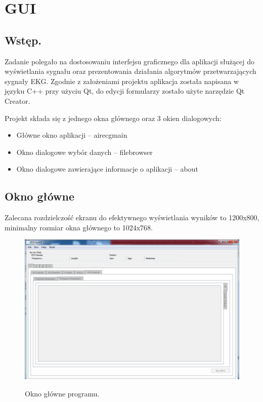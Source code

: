 \section{GUI}

\subsection{Wstęp.}
Zadanie polegało na dostosowaniu interfejsu graficznego dla aplikacji służącej do wyświetlania sygnału oraz prezentowania działania algorytmów przetwarzających sygnały EKG. Zgodnie z założeniami projektu aplikacja została napisana w języku C++ przy użyciu Qt, do edycji formularzy zostało użyte narzędzie Qt Creator. 

Projekt składa się z jednego okna głównego oraz 3 okien dialogowych:

\begin{itemize}
\item Główne okno aplikacji – airecgmain
\item Okno dialogowe wybór danych – filebrowser
\item Okno dialogowe zawierające informacje o aplikacji – about
\end{itemize}

\subsection{Okno główne}
Zalecana rozdzielczość ekranu do efektywnego wyświetlania wyników to 1200x800, minimalny rozmiar okna głównego to 1024x768. 

\begin{figure}[H]
\centering
\includegraphics[width=\textwidth]{GUI/img/okno_g}
\label{fig:okno_gi}
\caption{Okno główne programu.}
\end{figure}

